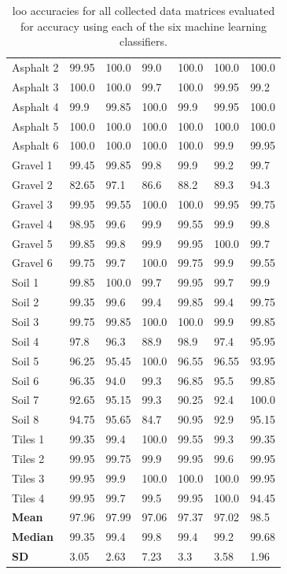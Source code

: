 \begin{table}
\begin{center}
\begin{adjustbox}{totalheight=\baselineskip}
\begin{tabular}{|l|l|l|l|l|l|l|}
		Asphalt 2 & 99.95 & 100.0 & 99.0 & 100.0 & 100.0 & 100.0\\
		Asphalt 3 & 100.0 & 100.0 & 99.7 & 100.0 & 99.95 & 99.2\\
		Asphalt 4 & 99.9 & 99.85 & 100.0 & 99.9 & 99.95 & 100.0\\
		Asphalt 5 & 100.0 & 100.0 & 100.0 & 100.0 & 100.0 & 100.0\\
		Asphalt 6 & 100.0 & 100.0 & 100.0 & 100.0 & 99.9 & 99.95\\
		\hline
		Gravel 1 & 99.45 & 99.85 & 99.8 & 99.9 & 99.2 & 99.7\\
		Gravel 2 & \cellcolor{red!20}82.65 & 97.1 & \cellcolor{red!20}86.6 & \cellcolor{red!20}88.2 & \cellcolor{red!20}89.3 & 94.3\\
		Gravel 3 & 99.95 & 99.55 & 100.0 & 100.0 & 99.95 & 99.75\\
		Gravel 4 & 98.95 & 99.6 & 99.9 & 99.55 & 99.9 & 99.8\\
		Gravel 5 & 99.85 & 99.8 & 99.9 & 99.95 & 100.0 & 99.7\\
		Gravel 6 & 99.75 & 99.7 & 100.0 & 99.75 & 99.9 & 99.55\\
		\hline
		Soil 1 & 99.85 & 100.0 & 99.7 & 99.95 & 99.7 & 99.9\\
		Soil 2& 99.35 & 99.6 & 99.4 & 99.85 & 99.4 & 99.75\\
		Soil 3 & 99.75 & 99.85 & 100.0 & 100.0 & 99.9 & 99.85\\
		Soil 4 & 97.8 & 96.3 & \cellcolor{red!20}88.9 & 98.9 & 97.4 & 95.95\\
		Soil 5 & 96.25 & 95.45 & 100.0 & 96.55 & 96.55 & 93.95\\
		Soil 6 & 96.35 & 94.0 & 99.3 & 96.85 & 95.5 & 99.85\\
		Soil 7 & 92.65 & 95.15 & 99.3 & 90.25 & 92.4 & 100.0\\
		Soil 8 & 94.75 & 95.65 & \cellcolor{red!20}84.7 & 90.95 & 92.9 & 95.15\\
		\hline
		Tiles 1 & 99.35 & 99.4 & 100.0 & 99.55 & 99.3 & 99.35\\
		Tiles 2 & 99.95 & 99.75 & 99.9 & 99.95 & 99.6 & 99.95\\
		Tiles 3 & 99.95 & 99.9 & 100.0 & 100.0 & 100.0 & 99.95\\
		Tiles 4 & 99.95 & 99.7 & 99.5 & 99.95 & 100.0 & 94.45\\
		\hline
		\textbf{Mean} & 97.96 & 97.99 & 97.06 & 97.37 & 97.02 & \cellcolor{green!20}98.5\\
		\textbf{Median} & 99.35 & 99.4 & \cellcolor{green!20}99.8 & 99.4 & 99.2 & 99.68\\
		\textbf{SD} & 3.05 & 2.63 & 7.23 & 3.3 & 3.58 & \cellcolor{green!20}1.96\\
		\hline
		\end{tabular}
	\end{adjustbox}
	\end{center}
	\caption{\gls{loo} accuracies for all collected data matrices evaluated for accuracy using each of the six machine learning classifiers.}
	\label{tab:loo}
\end{table}
\fi



